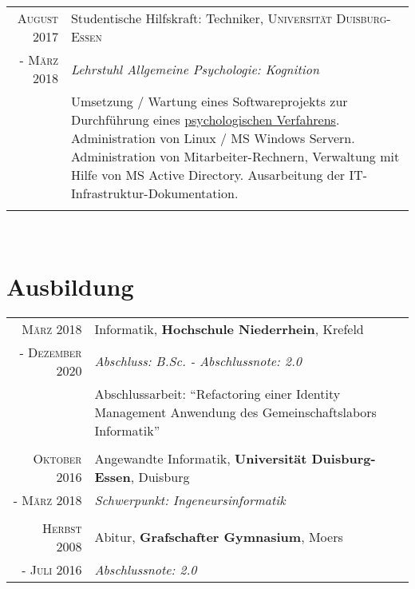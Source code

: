 \documentclass[10pt,a4paper]{article}
\begin{document}
\begin{tabular}{r|p{11cm}}
	 \textsc{August} 2017	& Studentische Hilfskraft: Techniker, \textsc{Universit\"at Duisburg-Essen} \\
	 - \textsc{M\"arz} 2018	& \emph{Lehrstuhl Allgemeine Psychologie: Kognition} \\
	 & \footnotesize{Umsetzung / Wartung eines Softwareprojekts zur Durchf\"uhrung eines \href{https://gdt.allgpsy.uni-due.de}{psychologischen Verfahrens}. Administration von Linux / MS Windows Servern. Administration von Mitarbeiter-Rechnern, Verwaltung mit Hilfe von MS Active Directory. Ausarbeitung der IT-Infrastruktur-Dokumentation.} \\
	 \multicolumn{2}{c}{} \\
\end{tabular} \\


\section{Ausbildung}

\begin{tabular}{r|p{11cm}}
	\textsc{M\"arz} 2018		& Informatik, \textbf{Hochschule Niederrhein}, Krefeld \\
	- \textsc{Dezember 2020}	& \emph{Abschluss: B.Sc. - Abschlussnote: 2.0} \\
	& Abschlussarbeit: ``Refactoring einer Identity Management Anwendung des Gemeinschaftslabors Informatik'' \\
	\multicolumn{2}{c}{} \\
	
	\textsc{Oktober} 2016	& Angewandte Informatik, \textbf{Universit\"at Duisburg-Essen}, Duisburg \\
	- \textsc{M\"arz} 2018	& \emph{Schwerpunkt: Ingeneursinformatik} \\
	\multicolumn{2}{c}{} \\
	
	\textsc{Herbst} 2008		& Abitur, \textbf{Grafschafter Gymnasium}, Moers \\
	- \textsc{Juli} 2016		& \emph{Abschlussnote: 2.0} \\
\end{tabular} \\

\newpage


%
%
%
\nocite{*}
\printbibliography[title={Publikationen}]
\end{document}
